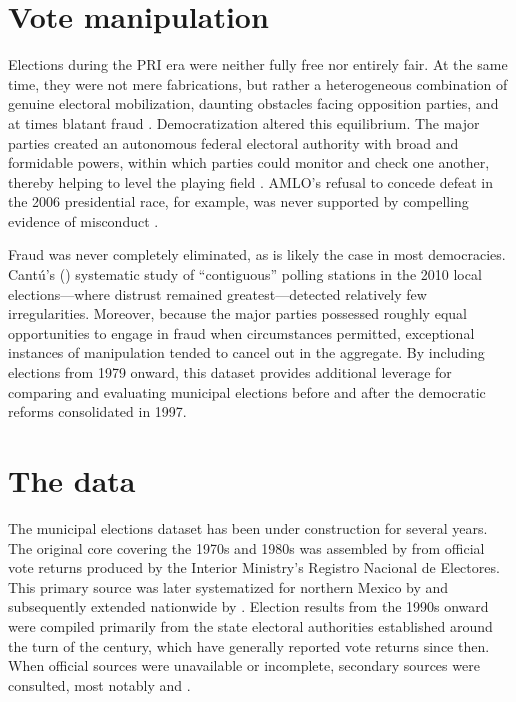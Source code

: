 \documentclass[letter,12pt]{article}
\begin{document}
\section{Vote manipulation}
Elections during the PRI era were neither fully free nor entirely fair. At the same time, they were not mere fabrications, but rather a heterogeneous combination of genuine electoral mobilization, daunting obstacles facing opposition parties, and at times blatant fraud \citep{molinar.1991a, cantuCSG2019apsr,magaloni.2006}. Democratization altered this equilibrium. The major parties created an autonomous federal electoral authority with broad and formidable powers, within which parties could monitor and check one another, thereby helping to level the playing field \citep{estevez.magar.rosas.2008}. AMLO's refusal to concede defeat in the 2006 presidential race, for example, was never supported by compelling evidence of misconduct \citep{klesner.FCHelections.2007}.

Fraud was never completely eliminated, as is likely the case in most democracies. Cantú's (\citeyear{cantuContiguas2014ajps}) systematic study of ``contiguous'' polling stations in the 2010 local elections---where distrust remained greatest---detected relatively few irregularities. Moreover, because the major parties possessed roughly equal opportunities to engage in fraud when circumstances permitted, exceptional instances of manipulation tended to cancel out in the aggregate. By including elections from 1979 onward, this dataset provides additional leverage for comparing and evaluating municipal elections before and after the democratic reforms consolidated in 1997.

\section{The data}

The municipal elections dataset has been under construction for several years. The original core covering the 1970s and 1980s was assembled by \citet{molinar.1991a} from official vote returns produced by the Interior Ministry's Registro Nacional de Electores. This primary source was later systematized for northern Mexico by \citet{magar.1994} and subsequently extended nationwide by \citet{varela.2004}. Election results from the 1990s onward were compiled primarily from the state electoral authorities established around the turn of the century, which have generally reported vote returns since then. When official sources were unavailable or incomplete, secondary sources were consulted, most notably \citet{revista.voz.y.voto} and \citet{cede.uam.izt}.
\end{document}
